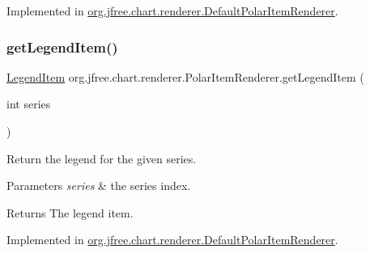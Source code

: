 Implemented in \mbox{\hyperlink{classorg_1_1jfree_1_1chart_1_1renderer_1_1_default_polar_item_renderer_a79cb58010b42feef92a7def54ad727ba}{org.\+jfree.\+chart.\+renderer.\+Default\+Polar\+Item\+Renderer}}.

\mbox{\label{interfaceorg_1_1jfree_1_1chart_1_1renderer_1_1_polar_item_renderer_a1160128616410b978a4b82ea265fdde2}} 
\subsubsection{\texorpdfstring{get\+Legend\+Item()}{getLegendItem()}}
{\footnotesize\ttfamily \mbox{\hyperlink{classorg_1_1jfree_1_1chart_1_1_legend_item}{Legend\+Item}} org.\+jfree.\+chart.\+renderer.\+Polar\+Item\+Renderer.\+get\+Legend\+Item (\begin{DoxyParamCaption}\item[{int}]{series }\end{DoxyParamCaption})}

Return the legend for the given series.


\begin{DoxyParams}{Parameters}
{\em series} & the series index.\\
\hline
\end{DoxyParams}
\begin{DoxyReturn}{Returns}
The legend item. 
\end{DoxyReturn}


Implemented in \mbox{\hyperlink{classorg_1_1jfree_1_1chart_1_1renderer_1_1_default_polar_item_renderer_ad8ab0846350353938551d224b76c16fb}{org.\+jfree.\+chart.\+renderer.\+Default\+Polar\+Item\+Renderer}}.

\mbox{\label{interfaceorg_1_1jfree_1_1chart_1_1renderer_1_1_polar_item_renderer_a3a7f957c63544df781986d288727a5cf}} 
